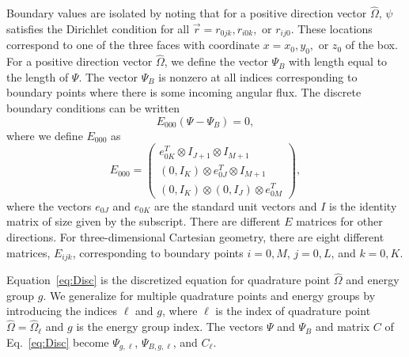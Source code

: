 Boundary values are isolated by noting that for a positive direction vector $\hat{\Omega}$, $\psi$ satisfies the Dirichlet condition for all $\vec{r} = r_{0jk}, r_{i0k},$ or $r_{ij0}$. These locations correspond to one of the three faces with coordinate $x = x_{0}, y_{0},$ or $z_{0}$ of the box. For a positive direction vector $\hat{\Omega}$, we define the vector $\Psi_{B}$ with length equal to the length of $\Psi$. The vector $\Psi_{B}$ is nonzero at all indices corresponding to boundary points where there is some incoming angular flux. The discrete boundary conditions can be written
\begin{equation}
	E_{000}(\Psi - \Psi_{B}) = 0,
\end{equation}
where we define $E_{000}$ as
\begin{equation}
	E_{000} = \begin{pmatrix}
				e_{0K}^{T} \otimes I_{J+1} \otimes I_{M+1} \\
				(0,I_{K}) \otimes e_{0J}^{T} \otimes I_{M+1} \\
				(0,I_{K}) \otimes (0,I_{J}) \otimes e_{0M}^{T}
			\end{pmatrix},
\end{equation}
where the vectors $e_{0J}$ and $e_{0K}$ are the standard unit vectors and $I$ is the identity matrix of size given by the subscript. There are different $E$ matrices for other directions. For three-dimensional Cartesian geometry, there are eight different matrices, $E_{ijk}$, corresponding to boundary points $i=0,M$, $j=0,L$, and $k = 0,K$.

Equation~\ref{eq:Disc} is the discretized equation for quadrature point $\hat{\Omega}$ and energy group $g$. We generalize for multiple quadrature points and energy groups by introducing the indices $\ell$ and $g$, where $\ell$ is the index of quadrature point $\hat{\Omega} = \hat{\Omega}_{\ell}$ and $g$ is the energy group index. The vectors $\Psi$ and $\Psi_{B}$ and matrix $C$ of Eq.~\ref{eq:Disc} become $\Psi_{g,\ell}$, $\Psi_{B,g,\ell}$, and $C_{\ell}$.

